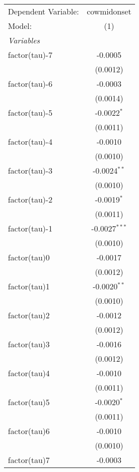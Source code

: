 \begingroup
\centering
\begin{tabular}{lc}
   \tabularnewline \midrule \midrule
   Dependent Variable: & cowmidonset\\  
   Model:              & (1)\\  
   \midrule
   \emph{Variables}\\
   factor(tau)-7       & -0.0005\\   
                       & (0.0012)\\   
   factor(tau)-6       & -0.0003\\   
                       & (0.0014)\\   
   factor(tau)-5       & -0.0022$^{*}$\\   
                       & (0.0011)\\   
   factor(tau)-4       & -0.0010\\   
                       & (0.0010)\\   
   factor(tau)-3       & -0.0024$^{**}$\\   
                       & (0.0010)\\   
   factor(tau)-2       & -0.0019$^{*}$\\   
                       & (0.0011)\\   
   factor(tau)-1       & -0.0027$^{***}$\\   
                       & (0.0010)\\   
   factor(tau)0        & -0.0017\\   
                       & (0.0012)\\   
   factor(tau)1        & -0.0020$^{**}$\\   
                       & (0.0010)\\   
   factor(tau)2        & -0.0012\\   
                       & (0.0012)\\   
   factor(tau)3        & -0.0016\\   
                       & (0.0012)\\   
   factor(tau)4        & -0.0010\\   
                       & (0.0011)\\   
   factor(tau)5        & -0.0020$^{*}$\\   
                       & (0.0011)\\   
   factor(tau)6        & -0.0010\\   
                       & (0.0010)\\   
   factor(tau)7        & -0.0003\\   

\end{tabular}
